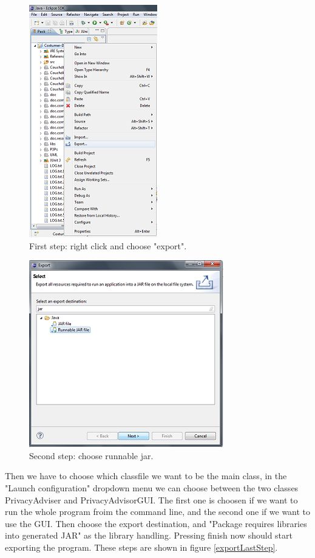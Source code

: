 \begin{centering}
  \begin{figure}
    \includegraphics{Documentation/export.png}
    \caption{First step: right click and choose "export".}
    \label{exportFirstStep}
  \end{figure}
\end{centering}

\begin{centering}
  \begin{figure}
    \includegraphics{Documentation/export_jar.png}
    \caption{Second step: choose runnable jar.}
    \label{exportSecondStep}
  \end{figure}
\end{centering}

Then we have to choose which classfile we want to be the main class, in the "Launch configuration" dropdown menu we can choose between the two classes PrivacyAdviser and PrivacyAdvisorGUI. The first one is choosen if we want to run the whole program froim the command line, and the second one if we want to use the GUI. Then choose the export destination, and "Package requires libraries into generated JAR" as the library handling. Pressing finish now should start exporting the program. These steps are shown in figure \ref{exportLastStep}.

